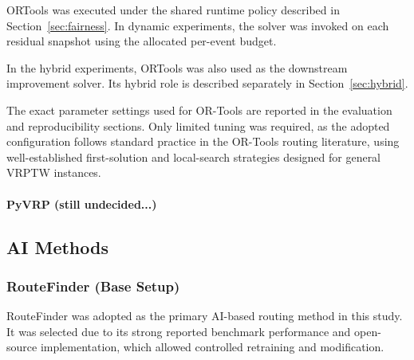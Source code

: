 ORTools was executed under the shared runtime policy described in
Section~\ref{sec:fairness}. In dynamic experiments, the solver was invoked on
each residual snapshot using the allocated per-event budget.

In the hybrid experiments, ORTools was also used as the downstream improvement
solver. Its hybrid role is described separately in Section~\ref{sec:hybrid}.

The exact parameter settings used for OR-Tools are reported in the evaluation
and reproducibility sections. Only limited tuning was required, as the adopted
configuration follows standard practice in the OR-Tools routing literature,
using well-established first-solution and local-search strategies designed for
general VRPTW instances.


\paragraph{PyVRP (still undecided...)}

\subsection{AI Methods}

\subsubsection{RouteFinder (Base Setup)}

RouteFinder was adopted as the primary AI-based routing method in this study. It
was selected due to its strong reported benchmark performance and open-source
implementation, which allowed controlled retraining and modification.
\cite{RouteFinder}

